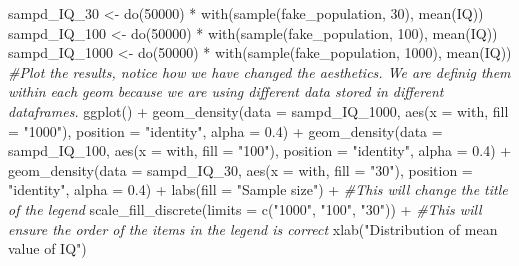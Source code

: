 \documentclass[
]{book}
\newenvironment{Shaded}{\begin{snugshade}}{\end{snugshade}}
\newcommand{\AttributeTok}[1]{\textcolor[rgb]{0.77,0.63,0.00}{#1}}
\newcommand{\CommentTok}[1]{\textcolor[rgb]{0.56,0.35,0.01}{\textit{#1}}}
\newcommand{\DecValTok}[1]{\textcolor[rgb]{0.00,0.00,0.81}{#1}}
\newcommand{\FloatTok}[1]{\textcolor[rgb]{0.00,0.00,0.81}{#1}}
\newcommand{\FunctionTok}[1]{\textcolor[rgb]{0.00,0.00,0.00}{#1}}
\newcommand{\NormalTok}[1]{#1}
\newcommand{\OtherTok}[1]{\textcolor[rgb]{0.56,0.35,0.01}{#1}}
\newcommand{\SpecialCharTok}[1]{\textcolor[rgb]{0.00,0.00,0.00}{#1}}
\newcommand{\StringTok}[1]{\textcolor[rgb]{0.31,0.60,0.02}{#1}}
\begin{document}
\begin{Shaded}
\begin{Highlighting}[]
\NormalTok{sampd\_IQ\_30 }\OtherTok{\textless{}{-}} \FunctionTok{do}\NormalTok{(}\DecValTok{50000}\NormalTok{) }\SpecialCharTok{*} \FunctionTok{with}\NormalTok{(}\FunctionTok{sample}\NormalTok{(fake\_population, }\DecValTok{30}\NormalTok{), }\FunctionTok{mean}\NormalTok{(IQ))}
\NormalTok{sampd\_IQ\_100 }\OtherTok{\textless{}{-}} \FunctionTok{do}\NormalTok{(}\DecValTok{50000}\NormalTok{) }\SpecialCharTok{*} \FunctionTok{with}\NormalTok{(}\FunctionTok{sample}\NormalTok{(fake\_population, }\DecValTok{100}\NormalTok{), }\FunctionTok{mean}\NormalTok{(IQ))}
\NormalTok{sampd\_IQ\_1000 }\OtherTok{\textless{}{-}} \FunctionTok{do}\NormalTok{(}\DecValTok{50000}\NormalTok{) }\SpecialCharTok{*} \FunctionTok{with}\NormalTok{(}\FunctionTok{sample}\NormalTok{(fake\_population, }\DecValTok{1000}\NormalTok{), }\FunctionTok{mean}\NormalTok{(IQ))}
\CommentTok{\#Plot the results, notice how we have changed the aesthetics. We are definig them within each geom because we are using different data stored in different dataframes.}
\FunctionTok{ggplot}\NormalTok{() }\SpecialCharTok{+} 
    \FunctionTok{geom\_density}\NormalTok{(}\AttributeTok{data =}\NormalTok{ sampd\_IQ\_1000, }\FunctionTok{aes}\NormalTok{(}\AttributeTok{x =}\NormalTok{ with, }\AttributeTok{fill =} \StringTok{"1000"}\NormalTok{), }\AttributeTok{position =} \StringTok{"identity"}\NormalTok{, }\AttributeTok{alpha =} \FloatTok{0.4}\NormalTok{) }\SpecialCharTok{+}
   \FunctionTok{geom\_density}\NormalTok{(}\AttributeTok{data =}\NormalTok{ sampd\_IQ\_100, }\FunctionTok{aes}\NormalTok{(}\AttributeTok{x =}\NormalTok{ with, }\AttributeTok{fill =} \StringTok{"100"}\NormalTok{), }\AttributeTok{position =} \StringTok{"identity"}\NormalTok{, }\AttributeTok{alpha =} \FloatTok{0.4}\NormalTok{) }\SpecialCharTok{+}
   \FunctionTok{geom\_density}\NormalTok{(}\AttributeTok{data =}\NormalTok{ sampd\_IQ\_30, }\FunctionTok{aes}\NormalTok{(}\AttributeTok{x =}\NormalTok{ with, }\AttributeTok{fill =} \StringTok{"30"}\NormalTok{), }\AttributeTok{position =} \StringTok{"identity"}\NormalTok{, }\AttributeTok{alpha =} \FloatTok{0.4}\NormalTok{) }\SpecialCharTok{+}
  \FunctionTok{labs}\NormalTok{(}\AttributeTok{fill =} \StringTok{"Sample size"}\NormalTok{) }\SpecialCharTok{+} \CommentTok{\#This will change the title of the legend}
  \FunctionTok{scale\_fill\_discrete}\NormalTok{(}\AttributeTok{limits =} \FunctionTok{c}\NormalTok{(}\StringTok{"1000"}\NormalTok{, }\StringTok{"100"}\NormalTok{, }\StringTok{"30"}\NormalTok{)) }\SpecialCharTok{+} \CommentTok{\#This will ensure the order of the items in the legend is correct}
  \FunctionTok{xlab}\NormalTok{(}\StringTok{"Distribution of mean value of IQ"}\NormalTok{)}
\end{Highlighting}
\end{Shaded}
\end{document}
